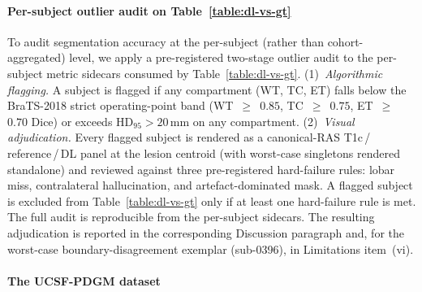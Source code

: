 \documentclass[a4paper,11pt,leqno]{article}
\begin{document}
\paragraph{Per-subject outlier audit on Table~\ref{table:dl-vs-gt}}

To audit segmentation accuracy at the per-subject (rather than
cohort-aggregated) level, we apply a pre-registered two-stage
outlier audit to the per-subject metric sidecars consumed by
Table~\ref{table:dl-vs-gt}. (1)~\emph{Algorithmic flagging.} A
subject is flagged if any compartment (WT, TC, ET) falls below the
BraTS-2018 strict operating-point band (WT~$\geq$~$0.85$,
TC~$\geq$~$0.75$, ET~$\geq$~$0.70$ Dice) or exceeds
HD$_{95}>20$\,mm on any compartment. (2)~\emph{Visual
adjudication.} Every flagged subject is rendered as a canonical-RAS
T1c\,/\,reference\,/\,DL panel at the lesion centroid (with
worst-case singletons rendered standalone) and reviewed against
three pre-registered hard-failure rules: lobar miss, contralateral
hallucination, and artefact-dominated mask. A flagged subject is
excluded from Table~\ref{table:dl-vs-gt} only if at least one
hard-failure rule is met. The full audit is reproducible from the per-subject sidecars. The resulting adjudication is reported in
the corresponding Discussion paragraph and, for the worst-case
boundary-disagreement exemplar (sub-0396), in Limitations
item~(vi).

\paragraph{The UCSF-PDGM dataset}

\vspace{2mm}
\end{document}
